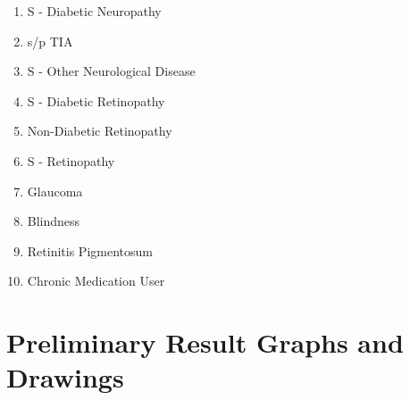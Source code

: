 \documentclass[a4paper,12pt]{article}
\begin{document}
\begin{appendices}
\begin{enumerate}
   			\item S - Diabetic Neuropathy
   			\item s/p TIA
   			\item S - Other Neurological Disease
   			\item S - Diabetic Retinopathy
   			\item Non-Diabetic Retinopathy
   			\item S - Retinopathy
   			\item Glaucoma
   			\item Blindness
   			\item Retinitis Pigmentosum
   			\item Chronic Medication User
   		\end{enumerate}
   		\newpage
   		
   		\section{Preliminary Result Graphs and Drawings}

\end{appendices}
\end{document}
